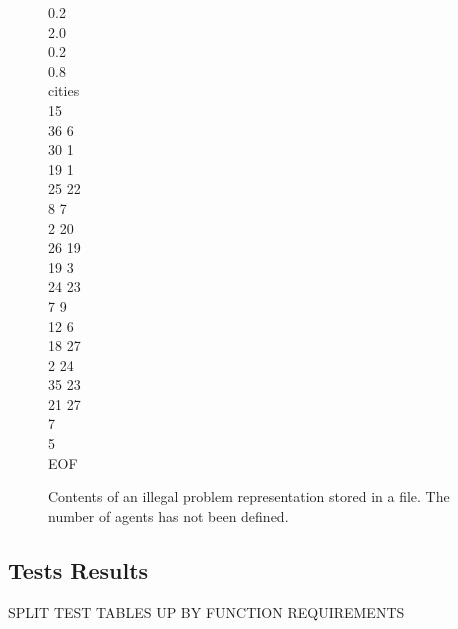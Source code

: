 \begin{figure}[H]
0.2 \\
2.0 \\
0.2 \\
0.8 \\
cities \\
15 \\
36 6 \\
30 1 \\
19 1 \\
25 22 \\
8 7 \\
2 20 \\
26 19 \\
19 3 \\
24 23 \\
7 9 \\
12 6 \\
18 27 \\
2 24 \\
35 23 \\
21 27 \\
7 \\
5 \\
EOF
\caption{Contents of an illegal problem representation stored in a file. The number of agents has not been defined.}
\label{invalidConfigMissing}
\end{figure}

\subsection{Tests Results}
\label{BBTests}

\Large SPLIT TEST TABLES UP BY FUNCTION REQUIREMENTS\normalsize